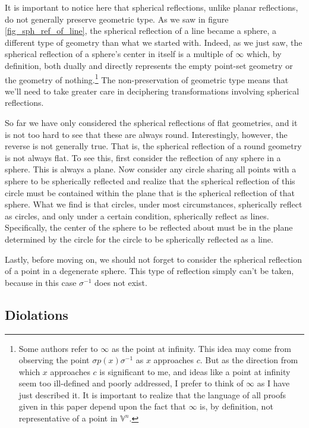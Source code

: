 \documentclass[12pt]{article}
\newcommand{\V}{\mathbb{V}}
\newcommand{\nvai}{\infty}
\begin{document}
It is important to notice here that spherical reflections, unlike planar reflections, do
not generally preserve geometric type.  As we saw in figure \ref{fig_sph_ref_of_line},
the spherical reflection of a line became a sphere, a different type of geometry than
what we started with.  Indeed, as we just saw, the spherical reflection of a sphere's
center in itself is a multiple of $\nvai$ which, by definition, both dually and directly represents
the empty point-set geometry or the geometry of nothing.\footnote{Some authors refer to $\nvai$ as the point at
infinity.  This idea may come from observing the point $\sigma p(x)\sigma^{-1}$ as $x$
approaches $c$.  But as the direction from which $x$ approaches $c$ is significant to me,
and ideas like a point at infinity seem too ill-defined and poorly addressed, I prefer to think of $\nvai$
as I have just described it.  It is important to realize that the language of all proofs given in this
paper depend upon the fact that $\nvai$ is, by definition, not representative of a point in $\V^n$.}
The non-preservation of geometric type means that we'll need
to take greater care in deciphering transformations involving spherical reflections.

So far we have only considered the spherical reflections of flat geometries, and it is
not too hard to see that these are always round.  Interestingly, however, the reverse
is not generally true.  That is, the spherical reflection of a round geometry is not
always flat.  To see this, first consider the reflection of any sphere in a sphere.
This is always a plane.  Now consider any circle sharing all points with a sphere to be
spherically reflected and realize that the spherical reflection of this circle must be
contained within the plane that is the spherical reflection of that sphere.  What we find is
that circles, under most circumstances, spherically reflect as circles, and only
under a certain condition, spherically reflect as lines.  Specifically, the center
of the sphere to be reflected about must be in the plane determined by the
circle for the circle to be spherically reflected as a line.

Lastly, before moving on, we should not forget to
consider the spherical reflection of a point in a degenerate sphere.  This
type of reflection simply can't be taken, because in this case $\sigma^{-1}$ does not exist.

\subsection{Diolations}
\end{document}
